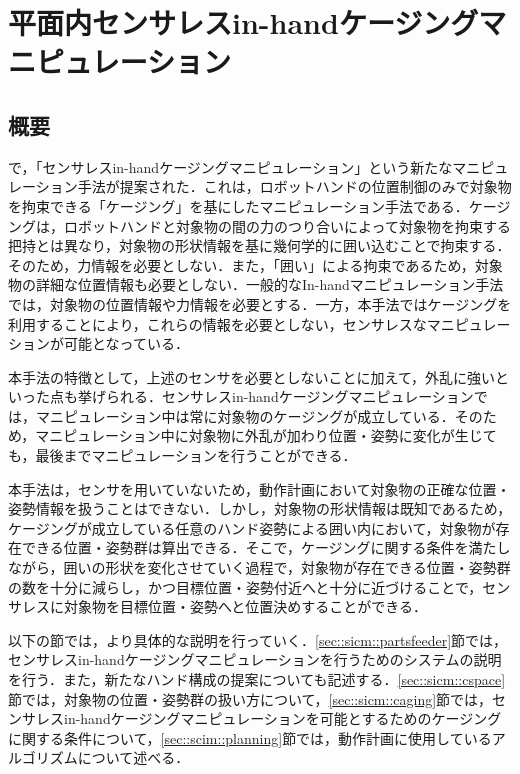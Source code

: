 \documentclass[a4paper,twoside,12pt,papersize, dvipdfmx]{iirthesis}
\begin{document}
    \newcommand{\figref}[1]{\figurename\ref{#1}}
    \newcommand{\tabref}[1]{\tablename\ref{#1}}
    \renewcommand{\eqref}[1]{式~(\ref{#1})}
    \newcommand{\chapref}[1]{\ref{#1}章}
    \newcommand{\secref}[1]{\ref{#1}節}
    \newcommand{\ssecref}[1]{\ref{#1}項}
    \newcommand{\appref}[1]{付録\ref{#1}}
\fi


\chapter{平面内センサレスin-handケージングマニピュレーション}\label{chap::sicm}
\minitoc

\section{概要}
\cite{asamura2013}で，「センサレスin-handケージングマニピュレーション」という新たなマニピュレーション手法が提案された．これは，ロボットハンドの位置制御のみで対象物を拘束できる「ケージング」\cite{rimon1999}を基にしたマニピュレーション手法である．ケージングは，ロボットハンドと対象物の間の力のつり合いによって対象物を拘束する把持とは異なり，対象物の形状情報を基に幾何学的に囲い込むことで拘束する．そのため，力情報を必要としない．また，「囲い」による拘束であるため，対象物の詳細な位置情報も必要としない．一般的なIn-handマニピュレーション手法では，対象物の位置情報や力情報を必要とする．一方，本手法ではケージングを利用することにより，これらの情報を必要としない，センサレスなマニピュレーションが可能となっている．\par
本手法の特徴として，上述のセンサを必要としないことに加えて，外乱に強いといった点も挙げられる．センサレスin-handケージングマニピュレーションでは，マニピュレーション中は常に対象物のケージングが成立している．そのため，マニピュレーション中に対象物に外乱が加わり位置・姿勢に変化が生じても，最後までマニピュレーションを行うことができる．\par
本手法は，センサを用いていないため，動作計画において対象物の正確な位置・姿勢情報を扱うことはできない．しかし，対象物の形状情報は既知であるため，ケージングが成立している任意のハンド姿勢による囲い内において，対象物が存在できる位置・姿勢群は算出できる．そこで，ケージングに関する条件を満たしながら，囲いの形状を変化させていく過程で，対象物が存在できる位置・姿勢群の数を十分に減らし，かつ目標位置・姿勢付近へと十分に近づけることで，センサレスに対象物を目標位置・姿勢へと位置決めすることができる．\par
以下の節では，より具体的な説明を行っていく．\secref{sec::sicm::partsfeeder}では，センサレスin-handケージングマニピュレーションを行うためのシステムの説明を行う．また，新たなハンド構成の提案についても記述する．\secref{sec::sicm::cspace}では，対象物の位置・姿勢群の扱い方について，\secref{sec::sicm::caging}では，センサレスin-handケージングマニピュレーションを可能とするためのケージングに関する条件について，\secref{sec::scim::planning}では，動作計画に使用しているアルゴリズムについて述べる．
\end{document}
